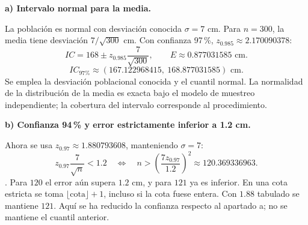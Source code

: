 \textbf{a) Intervalo normal para la media.}\par\nopagebreak[4]
La población es normal con desviación conocida $\sigma=7$ cm. Para $n=300$, la media tiene desviación $7/\sqrt{300}$ cm. Con confianza 97\,\%, $z_{0.985}\approx2.170090378$:
\[
IC=168\pm z_{0.985}\frac7{\sqrt{300}},\qquad E\approx0.877031585\text{ cm}.
\]
\[
\boxed{IC_{\text{97\%}}\approx(167.122968415,\ 168.877031585)\text{ cm}.}
\]
Se emplea la desviación poblacional conocida y el cuantil normal. La normalidad de la distribución de la media es exacta bajo el modelo de muestreo independiente; la cobertura del intervalo corresponde al procedimiento.

\textbf{b) Confianza 94\,\% y error estrictamente inferior a 1.2 cm.}\par\nopagebreak[4]
Ahora se usa $z_{0.97}\approx1.880793608$, manteniendo $\sigma=7$:
\[
z_{0.97}\frac7{\sqrt n}<1.2
\quad\Longleftrightarrow\quad
n>\left(\frac{7z_{0.97}}{1.2}\right)^2
\approx120.369336963.
\]
. Para $120$ el error aún supera $1.2$ cm, y para $121$ ya es inferior. En una cota estricta se toma $\lfloor\text{cota}\rfloor+1$, incluso si la cota fuese entera. Con $1.88$ tabulado se mantiene $121$. Aquí se ha reducido la confianza respecto al apartado a; no se mantiene el cuantil anterior.

